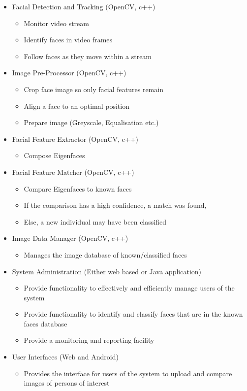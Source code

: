 \documentclass[a4paper]{article}
\begin{document}
				\begin{itemize}
				
					\item Facial Detection and Tracking (OpenCV, c++)
						\begin{itemize}
							\item Monitor video stream
							\item Identify faces in video frames
							\item Follow faces as they move within a stream
						\end{itemize}
					\item Image Pre-Processor (OpenCV, c++)
						\begin{itemize}
							\item Crop face image so only facial features remain
							\item Align a face to an optimal position
							\item Prepare image (Greyscale, Equalisation etc.)
						\end{itemize}
					\item Facial Feature Extractor (OpenCV, c++)
						\begin{itemize}
							\item Compose Eigenfaces
						\end{itemize}
					\item Facial Feature Matcher (OpenCV, c++)
						\begin{itemize}
							\item Compare Eigenfaces to known faces
							\item If the comparison has a high confidence, a match was found,
							\item Else, a new individual may have been classified
						\end{itemize}
					\item Image Data Manager (OpenCV, c++)
						\begin{itemize}
							\item Manages the image database of known/classified faces
						\end{itemize}
					\item System Administration (Either web based or Java application)
						\begin{itemize}
							\item Provide functionality to effectively and efficiently manage users of the system
							\item Provide functionality to identify and classify faces that are in the known faces database
							\item Provide a monitoring and reporting facility
						\end{itemize}
					\item User Interfaces (Web and Android)
						\begin{itemize}
							\item Provides the interface for users of the system to upload and compare images of persons of interest
						\end{itemize}
					
				\end{itemize}
	\newpage
	
\end{document}
